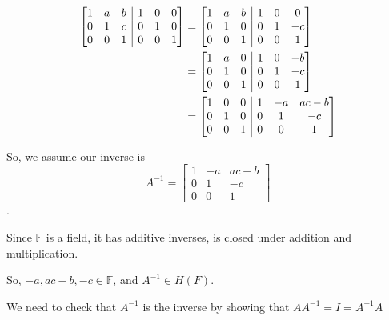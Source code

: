 \documentclass[12pt,letterpaper]{article}
\makeatletter
\newenvironment{bmat}[1]{
  \left[\begin{array}{@{}#1@{}}
}{\end{array}\right]
}
\makeatother
\begin{document}
\begin{enumerate}
\begin{enumerate}
          \begin{align*}
            \begin{bmat}{c c c | c c c}
              1 & a & b & 1 & 0 & 0 \\
              0 & 1 & c & 0 & 1 & 0 \\
              0 & 0 & 1 & 0 & 0 & 1
            \end{bmat}
            &=
            \begin{bmat}{c c c | c c c}
              1 & a & b & 1 & 0 & 0 \\
              0 & 1 & 0 & 0 & 1 & -c \\
              0 & 0 & 1 & 0 & 0 & 1
            \end{bmat} \\
            &=
            \begin{bmat}{c c c | c c c}
              1 & a & 0 & 1 & 0 & -b \\
              0 & 1 & 0 & 0 & 1 & -c \\
              0 & 0 & 1 & 0 & 0 & 1
            \end{bmat} \\
            &=
            \begin{bmat}{c c c | c c c}
              1 & 0 & 0 & 1 & -a & ac-b \\
              0 & 1 & 0 & 0 & 1 & -c \\
              0 & 0 & 1 & 0 & 0 & 1
            \end{bmat}
          \end{align*}

          So, we assume our inverse is
          \[A^{-1} =
            \begin{bmatrix}
              1 & -a & ac-b \\
              0 & 1 & -c \\
              0 & 0 & 1
            \end{bmatrix}
          \].

          Since $\mathbb{F}$ is a field, it has additive inverses, is closed under addition and multiplication.

          So, $-a, ac-b, -c \in \mathbb{F}$, and $A^{-1} \in H(F)$.

          We need to check that $A^{-1}$ is the inverse by showing that $AA^{-1} = I = A^{-1}A$


\end{enumerate}
\end{enumerate}
\end{document}

